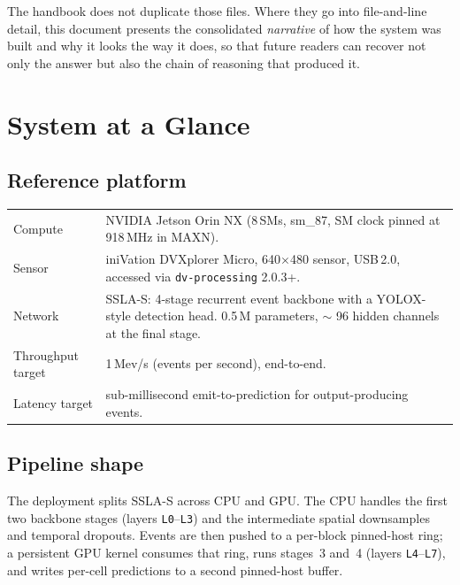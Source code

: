 \documentclass[11pt,a4paper]{article}
\begin{document}
The handbook does not duplicate those files. Where they go into
file-and-line detail, this document presents the consolidated
\emph{narrative} of how the system was built and why it looks the way it
does, so that future readers can recover not only the answer but also
the chain of reasoning that produced it.

\section{System at a Glance}

\subsection{Reference platform}

\begin{tabularx}{\linewidth}{lX}
\toprule
Compute & NVIDIA Jetson Orin NX (8\,SMs, sm\_87, SM clock pinned at
          918\,MHz in MAXN). \\
Sensor  & iniVation DVXplorer Micro, 640$\times$480 sensor, USB\,2.0,
          accessed via \texttt{dv-processing} 2.0.3+. \\
Network & SSLA-S: 4-stage recurrent event backbone with a YOLOX-style
          detection head. 0.5\,M parameters, $\sim$ 96 hidden channels
          at the final stage. \\
Throughput target & 1\,Mev/s (events per second), end-to-end. \\
Latency target    & sub-millisecond emit-to-prediction for output-producing
                    events. \\
\bottomrule
\end{tabularx}

\subsection{Pipeline shape}

The deployment splits SSLA-S across CPU and GPU. The CPU handles the
first two backbone stages (layers \texttt{L0}--\texttt{L3}) and the
intermediate spatial downsamples and temporal dropouts. Events are then
pushed to a per-block pinned-host ring; a persistent GPU kernel
consumes that ring, runs stages~3 and~4 (layers \texttt{L4}--\texttt{L7}),
and writes per-cell predictions to a second pinned-host buffer.
\end{document}
